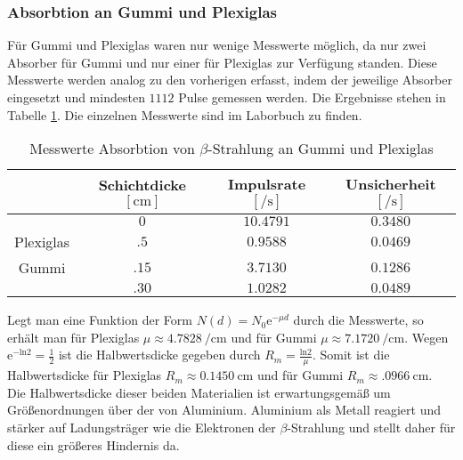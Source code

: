 \subsubsection{Absorbtion an Gummi und Plexiglas}
Für Gummi und Plexiglas waren nur wenige Messwerte möglich, da nur zwei Absorber für Gummi und nur einer für Plexiglas zur Verfügung standen. Diese Messwerte werden analog zu den vorherigen erfasst, indem der jeweilige Absorber eingesetzt und mindesten $ 1112 $ Pulse gemessen werden.
Die Ergebnisse stehen in Tabelle \ref{tab:abs_gum}. Die einzelnen Messwerte sind im Laborbuch zu finden.
\begin{table}[h!]
\centering
\begin{tabular}{c|c|c|c}
& Schichtdicke $ [\si{\centi\meter}] $ & Impulsrate $ [\si{\per\second}] $ & Unsicherheit $ [\si{\per\second}] $ \\\hline
& $ 0 $ & $ \num{10.4791} $ & $ \num{0.3480} $ \\ 
Plexiglas &  $ \num{.5} $ & $ \num{0.9588} $ & $ \num{0.0469} $ \\
Gummi & $ \num{.15} $ & $ \num{3.7130} $ & $ \num{0.1286} $ \\
	  &	$ \num{.30} $ & $ \num{1.0282} $ & $ \num{0.0489} $
\end{tabular}
\caption{Messwerte Absorbtion von $ \beta $-Strahlung an Gummi und Plexiglas}
\label{tab:abs_gum}
\end{table}
Legt man eine Funktion der Form $ N(d) = N_0 \mathrm{e}^{-\mu d} $ durch die Messwerte, so erhält man für Plexiglas $ \mu \approx \SI{4.7828}{\per\centi\meter} $ und für Gummi $ \mu \approx \SI{7.1720}{\per\centi\meter} $. Wegen $ \mathrm{e}^{-\mathrm{ln} 2} = \frac{1}{2} $ ist die Halbwertsdicke gegeben durch $ R_m = \frac{\mathrm{ln}2}{\mu} $. Somit ist die Halbwertsdicke für Plexiglas $ R_m \approx \SI{0.1450}{\centi\meter} $ und für Gummi $ R_m \approx \SI{.0966}{\centi\meter} $.\\
Die Halbwertsdicke dieser beiden Materialien ist erwartungsgemäß um Größenordnungen über der von Aluminium. Aluminium als Metall reagiert und stärker auf Ladungsträger wie die Elektronen der $ \beta $-Strahlung und stellt daher für diese ein größeres Hindernis da.

